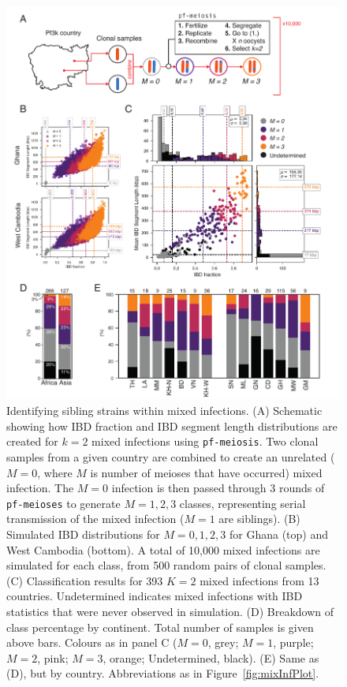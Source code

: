 \documentclass[9pt,lineno]{elife}
\begin{document}
\begin{figure}[htp]
  \begin{center}
  \includegraphics[width=\textwidth]{Fig6_corrected.pdf}
   \caption{Identifying sibling strains within mixed infections.  (A) Schematic showing how IBD fraction and IBD segment length distributions are created for $k=2$ mixed infections using \texttt{pf-meiosis}. Two clonal samples from a given country are combined to create an unrelated ($M=0$, where $M$ is number of meioses that have occurred) mixed infection.  The $M=0$ infection is then passed through 3 rounds of \texttt{pf-meioses} to generate $M=1,2,3$ classes, representing serial transmission of the mixed infection ($M=1$ are siblings). (B) Simulated IBD distributions for $M=0,1,2,3$ for Ghana (top) and West Cambodia (bottom). A total of 10,000 mixed infections are simulated for each class, from 500 random pairs of clonal samples. (C) Classification results for 393 $K=2$ mixed infections from 13 countries. Undetermined indicates mixed infections with IBD statistics that were never observed in simulation. (D) Breakdown of class percentage by continent. Total number of samples is given above bars. Colours as in panel C ($M=0$, grey; $M=1$, purple; $M=2$, pink; $M=3$, orange; Undetermined, black). (E) Same as (D), but by country. Abbreviations as in Figure~\ref{fig:mixInfPlot}.}
   \label{fig:classify}
   \end{center}
\end{figure}
\end{document}
